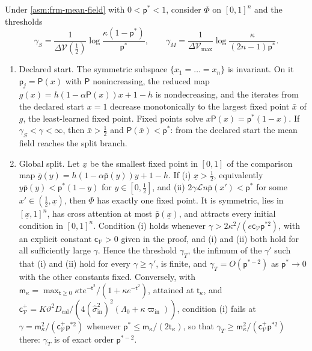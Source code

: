 \begin{theorem}\label{thm:frm-formation}
Under \cref{asm:frm-mean-field} with $0<\mathsf p^\ast<1$, consider $\Phi$ on $[0,1]^n$ and the thresholds
\begin{equation}\label{eq:frm-thresholds}
\gamma_S=\frac{1}{\Delta\mathcal V(\frac12)}\log\frac{\kappa(1-\mathsf p^\ast)}{\mathsf p^\ast},\qquad\gamma_M=\frac{1}{\Delta\mathcal V_{\max}}\log\frac{\kappa}{(2n-1)\mathsf p^\ast}.
\end{equation}
\begin{enumerate}
\item[(a)] Declared start. The symmetric subspace $\{x_1=\dots=x_n\}$ is invariant. On it $\mathsf p_j=\mathsf P(x)$ with $\mathsf P$ nonincreasing, the reduced map $g(x)=h(1-\alpha\mathsf P(x))x+1-h$ is nondecreasing, and the iterates from the declared start $x=1$ decrease monotonically to the largest fixed point $\bar x$ of $g$, the least-learned fixed point. Fixed points solve $x\mathsf P(x)=\mathsf p^\ast(1-x)$. If $\gamma_S<\gamma<\infty$, then $\bar x>\frac12$ and $\mathsf P(\bar x)<\mathsf p^\ast$: from the declared start the mean field reaches the split branch.
\item[(b)] Global split. Let $\underline x$ be the smallest fixed point in $[0,1]$ of the comparison map $\bar g(y)=h(1-\alpha\bar{\mathsf p}(y))y+1-h$. If (i) $\underline x>\frac12$, equivalently $y\bar{\mathsf p}(y)<\mathsf p^\ast(1-y)$ for $y\in[0,\frac12]$, and (ii) $2\gamma\mathcal Ln\bar{\mathsf p}(x')<\mathsf p^\ast$ for some $x'\in(\frac12,\underline x)$, then $\Phi$ has exactly one fixed point. It is symmetric, lies in $[\underline x,1]^n$, has cross attention at most $\bar{\mathsf p}(\underline x)$, and attracts every initial condition in $[0,1]^n$. Condition (i) holds whenever $\gamma>2\kappa^2/(e\mathsf c_{\mathcal V}\mathsf p^{\ast2})$, with an explicit constant $\mathsf c_{\mathcal V}>0$ given in the proof, and (i) and (ii) both hold for all sufficiently large $\gamma$. Hence the threshold $\gamma_T$, the infimum of the $\gamma'$ such that (i) and (ii) hold for every $\gamma\ge\gamma'$, is finite, and $\gamma_T=O(\mathsf p^{\ast-2})$ as $\mathsf p^\ast\to0$ with the other constants fixed. Conversely, with $\mathsf m_\kappa=\max_{\mathsf t\ge0}\kappa\mathsf te^{-\mathsf t^2}/(1+\kappa e^{-\mathsf t^2})$, attained at $\mathsf t_\kappa$, and $\mathsf c^+_{\mathcal V}=K\vartheta^2D_{\mathrm{cal}}/(4(\hat\sigma^2_{\mathrm{in}})^2(\Lambda_0+\kappa\varpi_{\mathrm{in}}))$, condition (i) fails at $\gamma=\mathsf m_\kappa^2/(\mathsf c^+_{\mathcal V}\mathsf p^{\ast2})$ whenever $\mathsf p^\ast\le\mathsf m_\kappa/(2\mathsf t_\kappa)$, so that $\gamma_T\ge\mathsf m_\kappa^2/(\mathsf c^+_{\mathcal V}\mathsf p^{\ast2})$ there: $\gamma_T$ is of exact order $\mathsf p^{\ast-2}$.

\end{enumerate}
\end{theorem}
